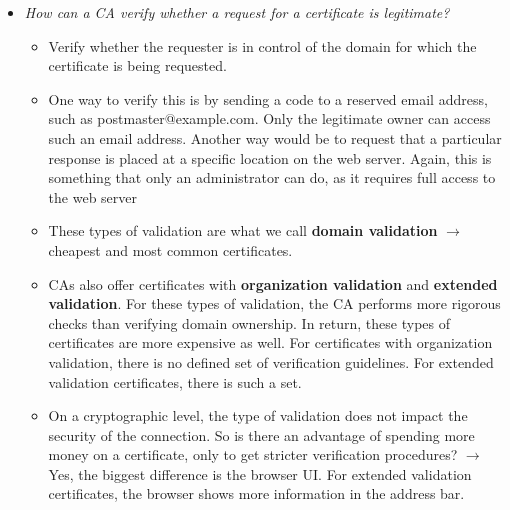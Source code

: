 \documentclass[../main.tex]{subfiles}
\begin{document}
\begin{itemize}
\item \emph{How can a CA verify whether a request for a certificate is legitimate?}
\begin{itemize}
\item Verify whether the requester is in control of the domain for which the certificate is being requested.
\item One way to verify this is by sending a code to a reserved email address, such as postmaster@example.com. Only the legitimate owner can access such an email address. Another way would be to request that a particular response is placed at a specific location on the web server. Again, this is something that only an administrator can do, as it requires full access to the web server
\item These types of validation are what we call \textbf{domain validation} $\rightarrow$ cheapest and most common certificates.
\item CAs also offer certificates with \textbf{organization validation} and \textbf{extended validation}. For these types of validation, the CA performs more rigorous checks than verifying domain ownership. In return, these types of certificates are more expensive as well. For certificates with organization validation, there is no defined set of verification guidelines. For extended validation certificates, there is such a set.
\item On a cryptographic level, the type of validation does not impact the security of the connection. So is there an advantage of spending more money on a certificate, only to get stricter verification procedures? $\rightarrow$ Yes, the biggest difference is the browser UI. For extended validation certificates, the browser shows more information in the address bar.
\end{itemize}
\end{itemize}
\end{document}
